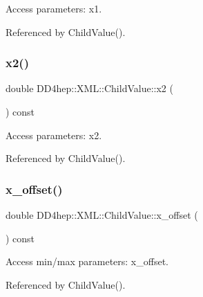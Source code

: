 Access parameters\+: x1. 



Referenced by Child\+Value().

\hypertarget{struct_d_d4hep_1_1_x_m_l_1_1_child_value_aa0d18183f1006617fe826438d9e4c060}{}\label{struct_d_d4hep_1_1_x_m_l_1_1_child_value_aa0d18183f1006617fe826438d9e4c060} 
\subsubsection{\texorpdfstring{x2()}{x2()}}
{\footnotesize\ttfamily double D\+D4hep\+::\+X\+M\+L\+::\+Child\+Value\+::x2 (\begin{DoxyParamCaption}{ }\end{DoxyParamCaption}) const}



Access parameters\+: x2. 



Referenced by Child\+Value().

\hypertarget{struct_d_d4hep_1_1_x_m_l_1_1_child_value_a3b0bd6317964cd3c6d70d217c625dcbd}{}\label{struct_d_d4hep_1_1_x_m_l_1_1_child_value_a3b0bd6317964cd3c6d70d217c625dcbd} 
\subsubsection{\texorpdfstring{x\+\_\+offset()}{x\_offset()}}
{\footnotesize\ttfamily double D\+D4hep\+::\+X\+M\+L\+::\+Child\+Value\+::x\+\_\+offset (\begin{DoxyParamCaption}{ }\end{DoxyParamCaption}) const}



Access min/max parameters\+: x\+\_\+offset. 



Referenced by Child\+Value().

\hypertarget{struct_d_d4hep_1_1_x_m_l_1_1_child_value_aece8cde74d53459f2ea675713e7ae1c8}{}\label{struct_d_d4hep_1_1_x_m_l_1_1_child_value_aece8cde74d53459f2ea675713e7ae1c8} 
